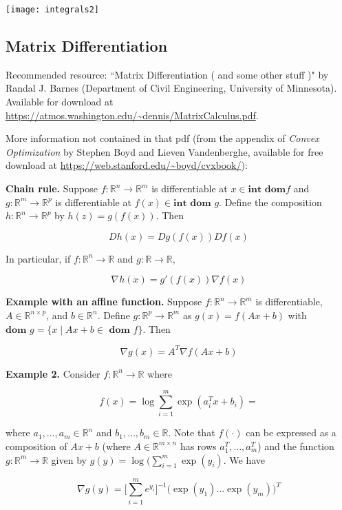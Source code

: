 \texttt{[image: integrals2]}

\subsection{Matrix Differentiation}

Recommended resource: ``Matrix Differentiation ( and some other stuff )" by Randal J. Barnes (Department of Civil Engineering, University of Minnesota). Available for download at \url{https://atmos.washington.edu/~dennis/MatrixCalculus.pdf}.

More information not contained in that pdf (from the appendix of \textit{Convex Optimization} by Stephen Boyd and Lieven Vandenberghe, available for free download at \url{https://web.stanford.edu/~boyd/cvxbook/}):

\textbf{Chain rule.} Suppose \(f: \mathbb{R}^n \to \mathbb{R}^m\) is differentiable at \(x \in \textbf{int} \textbf{ dom} f\) and  \(g: \mathbb{R}^m \to \mathbb{R}^p\) is differentiable at \(f(x) \in \textbf{int} \textbf{ dom } g\). Define the composition \(h: \mathbb{R}^n \to \mathbb{R}^p\) by \(h(z) =  g(f(x))\). Then

\[
D h(x) = Dg(f(x)) D f(x)
\]

In particular, if \(f: \mathbb{R}^n \to \mathbb{R}\) and  \(g: \mathbb{R} \to \mathbb{R}\),

\[
\nabla h(x) = g'(f(x)) \nabla f(x)
\]

\textbf{Example with an affine function.} Suppose \(f: \mathbb{R}^n \to \mathbb{R}^m\) is differentiable, \(A \in \mathbb{R}^{n \times p}\), and \(b \in \mathbb{R}^n\). Define \(g: \mathbb{R}^p \to \mathbb{R}^m\) as \(g(x) = f(Ax + b)\) with \(\textbf{dom } g = \{x \mid Ax + b \in \textbf{ dom } f \}\). Then 

\[
\nabla g(x) = A^T \nabla f(Ax + b)
\]

\textbf{Example 2.} Consider \(f: \mathbb{R}^n \to \mathbb{R}\) where 

\[
f(x) = \log \sum_{i=1}^m \exp(a_i^Tx + b_i) = 
\]

where \(a_1, \ldots, a_m \in \mathbb{R}^n\)  and \(b_1, \ldots, b_m \in \mathbb{R}\). Note that \(f(\cdot)\) can be expressed as a composition of \(Ax + b\) (where \(A \in \mathbb{R}^{m \times n}\) has rows \(a_1^T , \ldots, a_m^T\)) and the function \(g: \mathbb{R}^m \to \mathbb{R}\) given by \(g(y) = \log( \sum_{i=1}^m \exp(y_i)\). We have

\[
\nabla g(y) = \bigg[ \sum_{i=1}^m e^{y_i} \bigg]^{-1} \big( \exp(y_1) \ldots \exp(y_m) \big) ^T
\]

